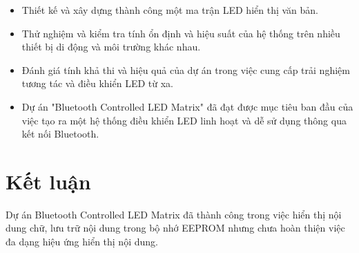 \documentclass[conference]{IEEEtran}
\begin{document}
\begin{itemize}
\item Thiết kế và xây dựng thành công một ma trận LED hiển thị văn bản.
\item Thử nghiệm và kiểm tra tính ổn định và hiệu suất của hệ thống trên nhiều thiết bị di động và môi trường khác nhau.
\item Đánh giá tính khả thi và hiệu quả của dự án trong việc cung cấp trải nghiệm tương tác và điều khiển LED từ xa.
\item Dự án "Bluetooth Controlled LED Matrix" đã đạt được mục tiêu ban đầu của việc tạo ra một hệ thống điều khiển LED linh hoạt và dễ sử dụng thông qua kết nối Bluetooth.
\end{itemize}

\section*{Kết luận}
Dự án Bluetooth Controlled LED Matrix đã thành công trong việc hiển thị nội dung chữ, lưu trữ nội dung trong bộ nhớ EEPROM nhưng chưa hoàn thiện việc đa dạng hiệu ứng hiển thị nội dung.
\end{document}
